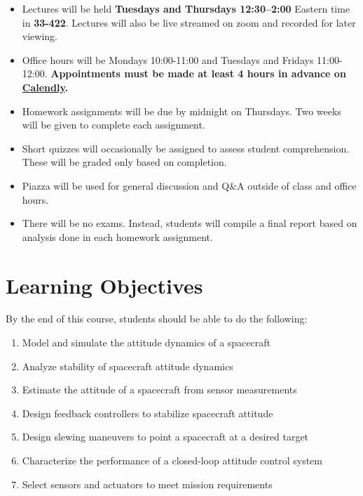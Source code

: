 \documentclass[11pt,letterpaper]{article}
\begin{document}
\begin{itemize}
	\item Lectures will be held \textbf{Tuesdays and Thursdays 12:30--2:00} Eastern time in \textbf{33-422}. Lectures will also be live streamed on zoom and recorded for later viewing.
	\item Office hours will be Mondays 10:00-11:00 and Tuesdays and Fridays 11:00-12:00. \textbf{Appointments must be made at least 4 hours in advance on \href{https://calendly.com/zacm-mit/adcs-office-hours}{Calendly}.}
	\item Homework assignments will be due by midnight on Thursdays. Two weeks will be given to complete each assignment.
	\item Short quizzes will occasionally be assigned to assess student comprehension. These will be graded only based on completion.
	\item Piazza will be used for general discussion and Q\&A outside of class and office hours.
	\item There will be no exams. Instead, students will compile a final report based on analysis done in each homework assignment.
\end{itemize}

\newpage 
\section*{Learning Objectives}
By the end of this course, students should be able to do the following:
\begin{enumerate}
	\item Model and simulate the attitude dynamics of a spacecraft
	\item Analyze stability of spacecraft attitude dynamics
	\item Estimate the attitude of a spacecraft from sensor measurements
	\item Design feedback controllers to stabilize spacecraft attitude
	\item Design slewing maneuvers to point a spacecraft at a desired target
	\item Characterize the performance of a closed-loop attitude control system
	\item Select sensors and actuators to meet mission requirements
\end{enumerate}
\end{document}
